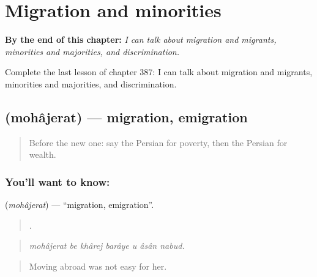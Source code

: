 
\chapter{Migration and minorities}
\label{ch:fa-migration-and-minorities}

\begin{chapteropening}
\textbf{By the end of this chapter:} \emph{I can talk about migration and migrants, minorities and majorities, and discrimination.}

Complete the last lesson of chapter 387: I can talk about migration and migrants, minorities and majorities, and discrimination.
\end{chapteropening}

\section[\texorpdfstring{\fa{مهاجرت} (mohâjerat)}{مهاجرت (mohâjerat)}]{ (mohâjerat) — migration, emigration}

\label{lesson:FA-C387-mohajerat}



\begin{quote}
Before the new one: say the Persian for poverty, then the Persian for wealth.
\end{quote}

\subsection*{You'll want to know: }
\textbf{} (\emph{mohâjerat}) — \textquotedblleft{}migration, emigration\textquotedblright{}.

\begin{quote}
      .
\end{quote}

\begin{quote}
\emph{mohâjerat be khârej barâye u âsân nabud.}
\end{quote}

\begin{quote}
Moving abroad was not easy for her.
\end{quote}

